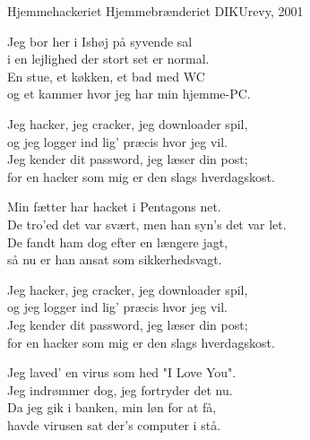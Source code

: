 \begin{song}{Hjemmehackeriet}
  {} %
  {Hjemmebrænderiet} %
  {} %
  {DIKUrevy, 2001} %
  {\NotCCLIed} %

  \begin{SBVerse}
    Jeg bor her i Ishøj på syvende sal\\
    i en lejlighed der stort set er normal.\\
    En stue, et køkken, et bad med WC\\
    og et kammer hvor jeg har min hjemme-PC.
  \end{SBVerse}

  \begin{SBChorus}
    Jeg hacker, jeg cracker, jeg downloader spil,\\
    og jeg logger ind lig' præcis hvor jeg vil.\\
    Jeg kender dit password, jeg læser din post;\\
    for en hacker som mig er den slags hverdagskost.
  \end{SBChorus}

  \begin{SBVerse}
    Min fætter har hacket i Pentagons net.\\
    De tro'ed det var svært, men han syn's det var let.\\
    De fandt ham dog efter en længere jagt,\\
    så nu er han ansat som sikkerhedsvagt.
  \end{SBVerse}

  \begin{SBChorus}
    Jeg hacker, jeg cracker, jeg downloader spil,\\
    og jeg logger ind lig' præcis hvor jeg vil.\\
    Jeg kender dit password, jeg læser din post;\\
    for en hacker som mig er den slags hverdagskost.
  \end{SBChorus}


  \begin{SBVerse}
    Jeg laved' en virus som hed "I Love You".\\
    Jeg indrømmer dog, jeg fortryder det nu.\\
    Da jeg gik i banken, min løn for at få,\\
    havde virusen sat der's computer i stå.
  \end{SBVerse}


\end{song}
